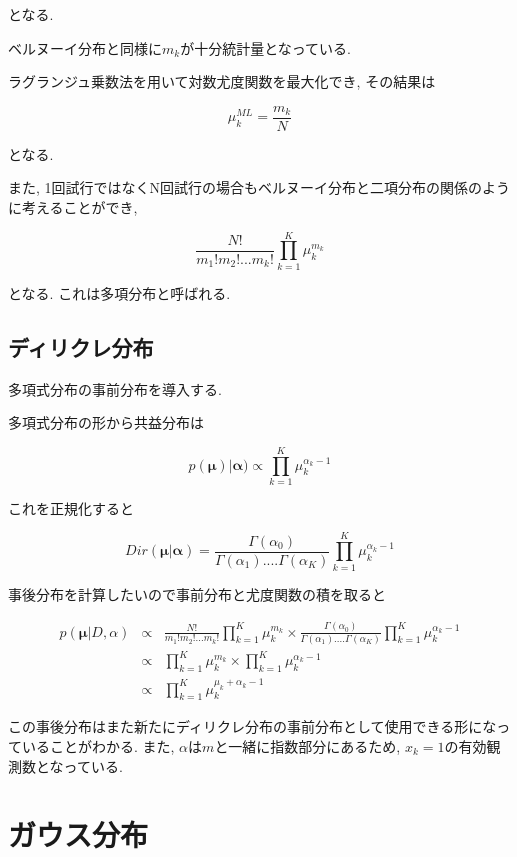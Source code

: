 となる.

ベルヌーイ分布と同様に$m_k$が十分統計量となっている.

ラグランジュ乗数法を用いて対数尤度関数を最大化でき, その結果は

$$ \mu_k^{ML} = \frac{m_k}{N} $$

となる.

また, 1回試行ではなくN回試行の場合もベルヌーイ分布と二項分布の関係のように考えることができ,

$$ \frac{N!}{m_1!m_2!...m_k!}\prod_{k=1}^K \mu_k^{m_k} $$

となる. これは多項分布と呼ばれる.

\subsection{ディリクレ分布}

多項式分布の事前分布を導入する.

多項式分布の形から共益分布は

$$ p(\bm{\mu})|\bm{\alpha}) \propto \prod_{k=1}^K \mu_k^{\alpha_k - 1} $$

これを正規化すると

$$ Dir(\bm{\mu}|\bm{\alpha}) = \frac{\Gamma(\alpha_0)}{\Gamma(\alpha_1)....\Gamma(\alpha_K)}\prod_{k=1}^K \mu_k^{\alpha_k - 1} $$

事後分布を計算したいので事前分布と尤度関数の積を取ると

\begin{eqnarray*}
    p(\bm{\mu}|D, \alpha) &\propto& \frac{N!}{m_1!m_2!...m_k!}\prod_{k=1}^K \mu_k^{m_k} \times \frac{\Gamma(\alpha_0)}{\Gamma(\alpha_1)....\Gamma(\alpha_K)}\prod_{k=1}^K \mu_k^{\alpha_k - 1} \\
    &\propto& \prod_{k=1}^K \mu_k^{m_k} \times \prod_{k=1}^K \mu_k^{\alpha_k - 1} \\
    &\propto& \prod_{k=1}^K \mu_k^{\mu_k + \alpha_k - 1}
\end{eqnarray*}

この事後分布はまた新たにディリクレ分布の事前分布として使用できる形になっていることがわかる.
また, $\alpha$は$m$と一緒に指数部分にあるため, $x_k=1$の有効観測数となっている.

\section{ガウス分布}



\newpage